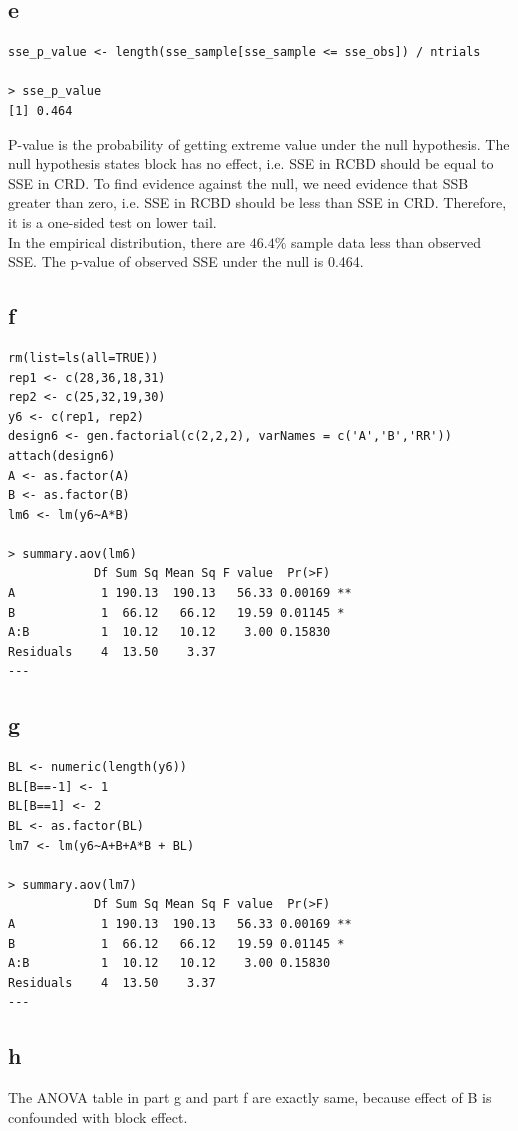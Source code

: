 \documentclass[11pt,letterpaper]{article}
\begin{document}
\subsection*{e}
\begin{verbatim}
sse_p_value <- length(sse_sample[sse_sample <= sse_obs]) / ntrials

> sse_p_value
[1] 0.464
\end{verbatim}

\noindent P-value is the probability of getting extreme value under the null hypothesis. The null hypothesis states block has no effect, i.e. SSE in RCBD should be equal to SSE in CRD. To find evidence against the null, we need evidence that SSB greater than zero, i.e. SSE in RCBD should be less than SSE in CRD. Therefore, it is a one-sided test on lower tail. \\

\noindent In the empirical distribution, there are $46.4 \%$ sample data less than observed SSE. The p-value of observed SSE under the null is 0.464.

\subsection*{f}
\begin{verbatim}
rm(list=ls(all=TRUE))
rep1 <- c(28,36,18,31)
rep2 <- c(25,32,19,30)
y6 <- c(rep1, rep2)
design6 <- gen.factorial(c(2,2,2), varNames = c('A','B','RR'))
attach(design6)
A <- as.factor(A)
B <- as.factor(B)
lm6 <- lm(y6~A*B)

> summary.aov(lm6)
            Df Sum Sq Mean Sq F value  Pr(>F)   
A            1 190.13  190.13   56.33 0.00169 **
B            1  66.12   66.12   19.59 0.01145 * 
A:B          1  10.12   10.12    3.00 0.15830   
Residuals    4  13.50    3.37                   
---
\end{verbatim}

\subsection*{g}
\begin{verbatim}
BL <- numeric(length(y6))
BL[B==-1] <- 1
BL[B==1] <- 2
BL <- as.factor(BL)
lm7 <- lm(y6~A+B+A*B + BL)

> summary.aov(lm7)
            Df Sum Sq Mean Sq F value  Pr(>F)   
A            1 190.13  190.13   56.33 0.00169 **
B            1  66.12   66.12   19.59 0.01145 * 
A:B          1  10.12   10.12    3.00 0.15830   
Residuals    4  13.50    3.37                   
---
\end{verbatim}

\subsection*{h}
\noindent The ANOVA table in part g and part f are exactly same, because effect of B is confounded with block effect. 
\end{document}
